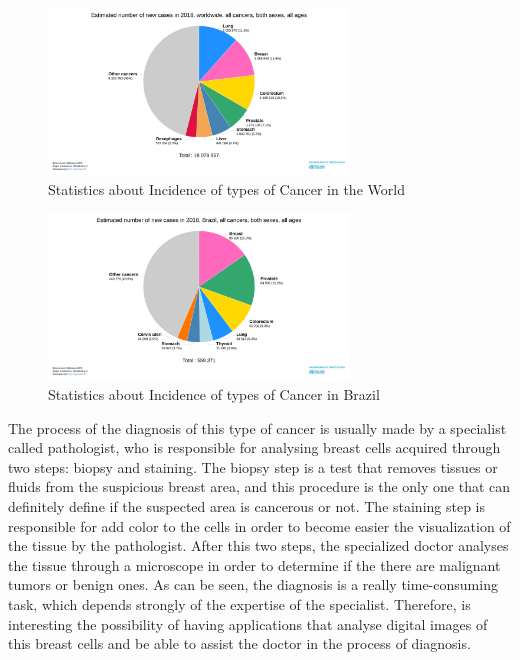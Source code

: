 \documentclass[conference]{IEEEtran}
\begin{document}
\begin{figure}[h]
    \centering
    \includegraphics[width=8cm]{images/graphic1.png}
    \caption{Statistics about Incidence of types of Cancer in the World \cite{GLOBOCAN}}
    \label{fig:my_label}
\end{figure}

\begin{figure}[h]
    \centering
    \includegraphics[width=8cm]{images/graphic2.png}
    \caption{Statistics about Incidence of types of Cancer in Brazil \cite{GLOBOCAN}}
    \label{fig:graphic2}
\end{figure}

\par The process of the diagnosis of this type of cancer is usually made by a specialist called pathologist, who is responsible for analysing breast cells acquired through two steps: biopsy and staining. The biopsy step is a test that removes tissues or fluids from the suspicious breast area, and this procedure is the only one that can definitely define if the suspected area is cancerous or not. The staining step is responsible for add color to the cells in order to become easier the visualization of the tissue by the pathologist. After this two steps, the specialized doctor analyses the tissue through a microscope in order to determine if the there are malignant tumors or benign ones. As can be seen, the diagnosis is a really time-consuming task, which depends strongly of the expertise of the specialist. Therefore, is interesting the possibility of having applications that analyse digital images of this breast cells and be able to assist the doctor in the process of diagnosis. 
\end{document}
